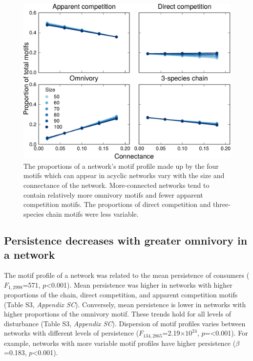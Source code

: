 \documentclass[12pt]{article}
\begin{document}
\begin{spacing}{2.0}
        \begin{figure}[h!]
            \centering
            \includegraphics[width=.75\textwidth]{manuscript/figures/motif_proportion_lms.pdf}
            \caption{The proportions of a network's motif profile made up by the four motifs which can appear in acyclic networks vary with the size and connectance of the network. More-connected networks tend to contain relatively more omnivory motifs and fewer apparent competition motifs. The proportions of direct competition and three-species chain motifs were less variable.}
            \label{motif_proportion_lms}
        \end{figure}

    \clearpage

    \subsection*{Persistence decreases with greater omnivory in a network}
    
        The motif profile of a network was related to the mean persistence of consumers ($F_{1,2998}$=571, $p$\textless0.001). Mean persistence was higher in networks with higher proportions of the chain, direct competition, and apparent competition motifs (Table S3, \emph{Appendix SC}). Conversely, mean persistence is lower in networks with higher proportions of the omnivory motif. These trends hold for all levels of disturbance (Table S3, \emph{Appendix SC}). Dispersion of motif profiles varies between networks with different levels of persistence ($F_{134,2865}$=2.19$\times10^{24}$, $p$=\textless0.001). For example, networks with more variable motif profiles have higher persistence ($\beta$=0.183, $p$\textless0.001).



\end{spacing}
\end{document}
